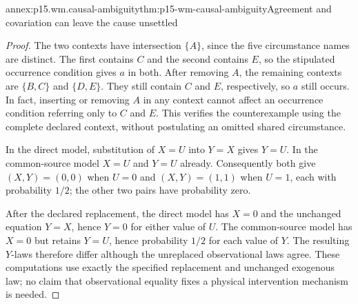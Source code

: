 \begin{annexitem}{annex:p15.wm.causal-ambiguity}{thm:p15-wm-causal-ambiguity}{Agreement and covariation can leave the cause unsettled}
\begin{proof}
The two contexts have intersection \(\{A\}\), since the five circumstance
names are distinct. The first contains \(C\) and the second contains \(E\),
so the stipulated occurrence condition gives \(a\) in both.
After removing \(A\), the remaining contexts are \(\{B,C\}\) and
\(\{D,E\}\). They still contain \(C\) and \(E\), respectively, so
\(a\) still occurs. In fact, inserting or removing \(A\) in any context
cannot affect an occurrence condition referring only to \(C\) and \(E\).
This verifies the counterexample using the complete declared context,
without postulating an omitted shared circumstance.

In the direct model, substitution of \(X=U\) into \(Y=X\) gives \(Y=U\).
In the common-source model \(X=U\) and \(Y=U\) already.
Consequently both give \((X,Y)=(0,0)\) when \(U=0\) and
\((X,Y)=(1,1)\) when \(U=1\), each with probability \(1/2\);
the other two pairs have probability zero.

After the declared replacement, the direct model has \(X=0\) and
the unchanged equation \(Y=X\), hence \(Y=0\) for either value of \(U\).
The common-source model has \(X=0\) but retains \(Y=U\), hence
probability \(1/2\) for each value of \(Y\).
The resulting \(Y\)-laws therefore differ although the unreplaced
observational laws agree. These computations use exactly the specified
replacement and unchanged exogenous law; no claim that observational
equality fixes a physical intervention mechanism is needed.
\end{proof}
\end{annexitem}

